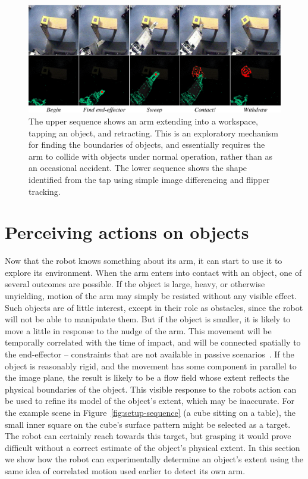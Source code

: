 \begin{figure}[tb]
\begin{center}
\includegraphics[width=\columnwidth]{poking-sequence.eps}

\caption{ 
\label{fig:poking-sequence}
%
  The upper sequence shows an arm extending into a workspace, tapping
  an object, and retracting.  This is an exploratory mechanism for
  finding the boundaries of objects, and essentially requires the arm
  to collide with objects under normal operation, rather than as an
  occasional accident.  The lower sequence shows the shape
  identified from the tap using simple image differencing and flipper
  tracking.
%
}
\end{center}
\end{figure}



\section{Perceiving actions on objects}

Now that the robot knows something about its arm, it can start
to use it to explore its environment.
When the arm enters into contact with an object, one of several
outcomes are possible.  If the object is large, heavy, or otherwise
unyielding, motion of the arm may simply be resisted without any
visible effect.  Such objects are of little interest, except in their
role as obstacles, since the robot will not be able to manipulate
them.  But if the object is smaller, it is likely to move a little in
response to the nudge of the arm.  This movement will be temporally
correlated with the time of impact, and will be connected spatially to
the end-effector -- constraints that are not available in passive
scenarios~\cite{birchfield99depth}.  If the object is reasonably
rigid, and the movement has some component in parallel to the image
plane, the result is likely to be a flow field whose extent reflects
the physical boundaries of the object.  This visible response to
the robots action can be used to refine its model of the object's
extent, which may be inaccurate.  For the example scene in
Figure~\ref{fig:setup-sequence} (a cube sitting on a table), the small
inner square on the cube's surface pattern might be selected as a
target.  The robot can certainly reach towards this target, but
grasping it would prove difficult without a correct estimate of the
object's physical extent.  In this section we show how the robot can
experimentally determine an object's extent using the same idea of
correlated motion used earlier to detect its own arm.

